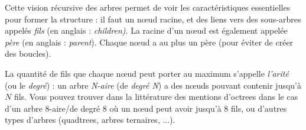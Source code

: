 \documentclass[11pt,a4paper]{article}
\begin{document}
\begin{center}
\begin{table}[ht!]
\begin{minipage}{0.22\textwidth}
  \end{minipage}
  \hfillx
  \begin{minipage}{0.43\textwidth}


  \end{minipage}
\end{table}

\end{center}

Cette vision récursive des arbres permet de voir les caractéristiques essentielles pour former la structure : il faut un nœud racine, et des liens vers des sous-arbres appelés \textit{fils} (en anglais : \textit{children)}.
La racine d'un nœud est également appelée \textit{père} (en anglais : \textit{parent}).
Chaque nœud a au plus un père (pour éviter de créer des boucles).

La quantité de fils que chaque nœud peut porter au maximum s'appelle \textit{l'arité} (ou le \textit{degré}) : un arbre \textit{N-aire} (de \textit{degré N}) a des nœuds pouvant contenir jusqu'à $ N $ fils.
Vous pouvez trouver dans la littérature des mentions d'octrees dans le cas d'un arbre 8-aire/de degré 8 où un nœud peut avoir jusqu'à 8 fils, ou d'autres types d'arbres (quadtrees, arbres ternaires, ...).
%

\end{document}
